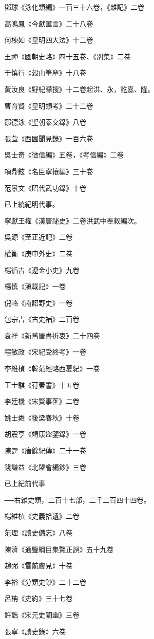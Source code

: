 鄧球《泳化類編》一百三十六卷，《雜記》二卷

高鳴鳳《今獻匯言》二十八卷

何棟如《皇明四大法》十二卷

王禪《國朝史略》四十五卷、《別集》二卷

于慎行《穀山筆麈》十八卷

黃汝良《野紀矇搜》十二卷起洪、永，訖嘉、隆。

曹育賢《皇明類考》二十二卷

鄒德泳《聖朝泰交錄》八卷

張萱《西園聞見錄》一百六卷

吳士奇《徵信編》五卷，《考信編》二卷

項鼎鉉《名臣寧攘編》三十卷

范景文《昭代武功錄》十卷

已上統紀明代事。

寧獻王權《漢唐祕史》二卷洪武中奉敕編次。

吳源《至正近記》二卷

權衡《庚申外史》二卷

楊循吉《遼金小史》九卷

楊慎《滇載記》一卷

倪輅《南詔野史》一卷

包宗吉《古史補》二百卷

袁祥《新舊唐書折衷》二十四卷

程敏政《宋紀受終考》一卷

李維楨《韓范經略西夏紀》一卷

王士騏《苻秦書》十五卷

李廷機《宋賢事匯》二卷

姚士粦《後梁春秋》十卷

胡震亨《靖康盜鑒錄》一卷

陳霆《唐餘紀傳》二十一卷

錢謙益《北盟會編鈔》三卷

已上紀前代事

──右雜史類，二百十七部，二千二百四十四卷。

楊維楨《史義拾遺》二卷

范理《讀史備忘》八卷

陳濟《通鑒綱目集覽正誤》五十九卷

趙弼《雪航膚見》十卷

李裕《分類史鈔》二十二卷

呂柟《史約》三十七卷

許誥《宋元史闡幽》三卷

張寧《讀史錄》六卷

